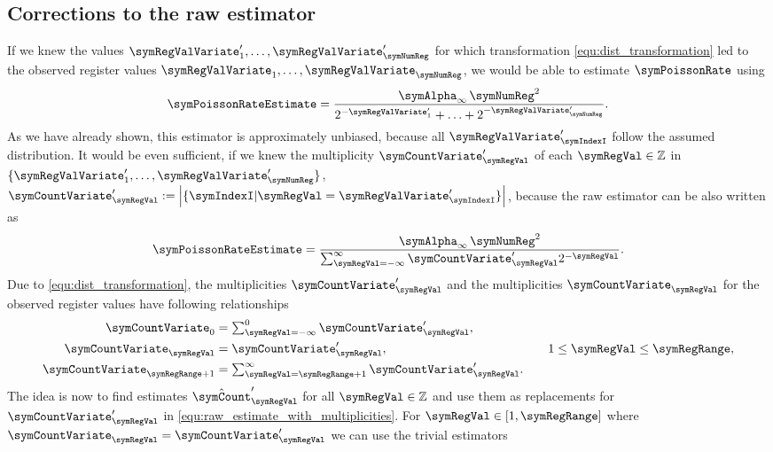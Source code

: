 \documentclass[a4paper]{scrartcl}
\begin{document}
\subsection{Corrections to the raw estimator}
If we knew the values $\symRegValVariate'_1,\ldots,\symRegValVariate'_\symNumReg$ for which transformation \eqref{equ:dist_transformation} led to the observed register values $\symRegValVariate_1,\ldots,\symRegValVariate_\symNumReg$, we would be able to estimate $\symPoissonRate$ using
\begin{equation}
\symPoissonRateEstimate 
= 
\frac{\symAlpha_\infty\,\symNumReg^2}{2^{-\symRegValVariate'_1}+\ldots+2^{-\symRegValVariate'_\symNumReg}}.
\end{equation}
As we have already shown, this estimator is approximately unbiased, because all $\symRegValVariate'_\symIndexI$ follow the assumed distribution. It would be even sufficient, if we knew the multiplicity $\symCountVariate'_\symRegVal$
of each $\symRegVal\in\mathbb{Z}$ in $\lbrace\symRegValVariate'_1,\ldots,\symRegValVariate'_\symNumReg\rbrace$, $\symCountVariate'_\symRegVal := \left|\lbrace \symIndexI\vert \symRegVal = \symRegValVariate'_\symIndexI\rbrace\right|$, because the raw estimator can be also written as
\begin{equation}
\label{equ:raw_estimate_with_multiplicities}
\symPoissonRateEstimate 
= 
\frac{\symAlpha_\infty\,\symNumReg^2}{\sum_{\symRegVal=-\infty}^\infty \symCountVariate'_\symRegVal 2^{-\symRegVal}}.
\end{equation}
Due to \eqref{equ:dist_transformation}, the multiplicities $\symCountVariate'_\symRegVal$ and the multiplicities $\symCountVariate_\symRegVal$ for the observed register values have following relationships
\begin{equation}
\label{equ:multiplicity_transformation}
\begin{aligned}
\symCountVariate_0 &= \textstyle\sum_{\symRegVal = -\infty}^{0} \symCountVariate'_\symRegVal,& \\
\symCountVariate_\symRegVal &=  \symCountVariate'_\symRegVal,& \quad 1\leq\symRegVal\leq\symRegRange,\\
\symCountVariate_{\symRegRange+1} &= \textstyle\sum_{\symRegVal = \symRegRange + 1}^{\infty} \symCountVariate'_\symRegVal.&
\end{aligned}
\end{equation}
The idea is now to find estimates $\hat{\symCount}'_\symRegVal$ for all $\symRegVal\in\mathbb{Z}$ and use them as replacements for $\symCountVariate'_\symRegVal$ in \eqref{equ:raw_estimate_with_multiplicities}. For $\symRegVal\in[1,\symRegRange]$ where $\symCountVariate_\symRegVal = \symCountVariate'_\symRegVal$ we can use the trivial estimators 
\end{document}
